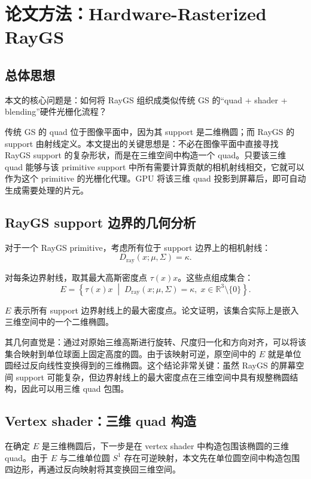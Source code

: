 \documentclass[12pt,hyperref,a4paper,UTF8]{ctexart}
\begin{document}
\section{论文方法：Hardware-Rasterized RayGS}
\subsection{总体思想}
本文的核心问题是：如何将 RayGS 组织成类似传统 GS 的“quad + shader + blending”硬件光栅化流程？

传统 GS 的 quad 位于图像平面中，因为其 support 是二维椭圆；而 RayGS 的 support 由射线定义。本文提出的关键思想是：不必在图像平面中直接寻找 RayGS support 的复杂形状，而是在三维空间中构造一个 quad。只要该三维 quad 能够与该 primitive support 中所有需要计算贡献的相机射线相交，它就可以作为这个 primitive 的光栅化代理。GPU 将该三维 quad 投影到屏幕后，即可自动生成需要处理的片元。



\subsection{RayGS support 边界的几何分析}
对于一个 RayGS primitive，考虑所有位于 support 边界上的相机射线：
\begin{equation}
\displaystyle
D_{\mathrm{ray}}(x;\mu,\Sigma)=\kappa .
\end{equation}

对每条边界射线，取其最大高斯密度点 $\tau(x)x$。这些点组成集合：
\begin{equation}
\displaystyle
E
=
\left\{
\tau(x)x \;\middle|\;
D_{\mathrm{ray}}(x;\mu,\Sigma)=\kappa,\;
x\in\mathbb{R}^{3}\setminus\{0\}
\right\}.
\end{equation}

$E$ 表示所有 support 边界射线上的最大密度点。论文证明，该集合实际上是嵌入三维空间中的一个二维椭圆。

其几何直觉是：通过对原始三维高斯进行旋转、尺度归一化和方向对齐，可以将该集合映射到单位球面上固定高度的圆。由于该映射可逆，原空间中的 $E$ 就是单位圆经过反向线性变换得到的三维椭圆。这个结论非常关键：虽然 RayGS 的屏幕空间 support 可能复杂，但边界射线上的最大密度点在三维空间中具有规整椭圆结构，因此可以用三维 quad 包围。


\subsection{Vertex shader：三维 quad 构造}
在确定 $E$ 是三维椭圆后，下一步是在 vertex shader 中构造包围该椭圆的三维 quad。由于 $E$ 与二维单位圆 $S^1$ 存在可逆映射，本文先在单位圆空间中构造包围四边形，再通过反向映射将其变换回三维空间。
\end{document}
